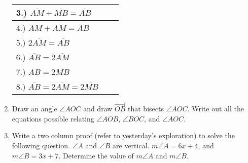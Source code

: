 \documentclass[12pt,letterpaper]{article}
\begin{document}
\begin{enumerate}
\begin{tabularx}{0.95\textwidth} {
                  | >{\raggedright\arraybackslash}X
                  | >{\centering\arraybackslash}X
                  | >{\raggedleft\arraybackslash}X |}
              \hline
              \vspace{0.5mm} 3.) $\overline{AM}+\overline{MB}=\overline{AB}$   &        \\
              \hline
              \vspace{0.5mm} 4.) $\overline{AM}+\overline{AM}=\overline{AB}$   &        \\
              \hline
              \vspace{0.5mm} 5.) $2\overline{AM}=\overline{AB}$                &        \\
              \hline
              \vspace{0.5mm} 6.) $\overline{AB}=2\overline{AM}$                &        \\
              \hline
              \vspace{0.5mm} 7.) $\overline{AB}=2\overline{MB}$                &        \\
              \hline
              \vspace{0.5mm} 8.) $\overline{AB}=2\overline{AM}=2\overline{MB}$ &        \\
              \hline
          \end{tabularx}

    \item Draw an angle $\angle AOC$ and draw $\overrightarrow{OB}$ that bisects $\angle AOC$. Write out all the equations possible relating $\angle AOB$, $\angle BOC$, and $\angle AOC$.
    \item Write a two column proof (refer to yesterday's exploration) to solve the following question. $\angle A$ and $\angle B$ are vertical. $m\angle A=6x+4$, and $m\angle B=3x+7$. Determine the value of $m\angle A$ and $m\angle B$.
\end{enumerate}
\end{document}
